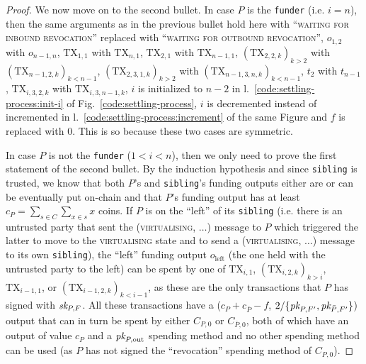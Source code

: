 \begin{proof}
  We now move on to the second bullet. In case $P$ is the \texttt{funder} (i.e.
  $i=n$), then the same arguments as in the previous bullet hold here with
  ``\textsc{waiting for inbound revocation}'' replaced with ``\textsc{waiting
  for outbound revocation}'', $o_{1, 2}$ with $o_{n-1, n}$, $\mathrm{TX}_{1, 1}$
  with $\mathrm{TX}_{n, 1}$, $\mathrm{TX}_{2, 1}$ with $\mathrm{TX}_{n-1, 1}$,
  $(\mathrm{TX}_{2, 2, k})_{k > 2}$ with $(\mathrm{TX}_{n-1, 2, k})_{k < n-1}$,
  $(\mathrm{TX}_{2, 3, 1, k})_{k > 2}$ with $(\mathrm{TX}_{n-1, 3, n, k})_{k <
  n-1}$, $t_2$ with $t_{n-1}$, $\mathrm{TX}_{i, 3, 2, k}$ with $\mathrm{TX}_{i,
  3, n-1, k}$, $i$ is initialized to $n-2$ in
  l.~\ref{code:settling-process:init-i} of Fig.~\ref{code:settling-process}, $i$
  is decremented instead of incremented in
  l.~\ref{code:settling-process:increment} of the same Figure and $f$ is
  replaced with $0$. This is so because these two cases are symmetric.

  In case $P$ is not the \texttt{funder} ($1<i<n$), then we only need to prove
  the first statement of the second bullet. By the induction hypothesis and
  since \texttt{sibling} is trusted, we know that both $P$'s and
  \texttt{sibling}'s funding outputs either are or can be eventually put
  on-chain and that $P$'s funding output has at least $c_P = \sum\limits_{s \in
  C} \sum\limits_{x \in s} x$ coins. If $P$ is on the ``left'' of its
  \texttt{sibling} (i.e. there is an untrusted party that sent the
  (\textsc{virtualising}, $\dots$) message to $P$ which triggered the latter to
  move to the \textsc{virtualising} state and to send a (\textsc{virtualising},
  $\dots$) message to its own \texttt{sibling}), the ``left'' funding output
  $o_{\mathrm{left}}$ (the one held with the untrusted party to the left) can be
  spent by one of $\mathrm{TX}_{i, 1}$, $(\mathrm{TX}_{i, 2, k})_{k > i}$,
  $\mathrm{TX}_{i-1, 1}$, or $(\mathrm{TX}_{i-1, 2, k})_{k < i-1}$, as these are
  the only transactions that $P$ has signed with $\textit{sk}_{P, F}$. All these
  transactions have a ($c_P + c_{\bar{P}} - f$, $2/\{\textit{pk}_{P, F'}, \textit{pk}_{\bar{P},
  F'}\}$) output that can in turn be spent by either $C_{P, 0}$ or $C_{\bar{P},
  0}$, both of which have an output of value $c_P$ and a $\textit{pk}_{P, \mathrm{out}}$
  spending method and no other spending method can be used (as $P$ has not
  signed the ``revocation'' spending method of $C_{P, 0}$).


\end{proof}
